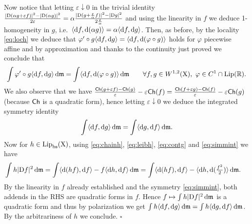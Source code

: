\documentclass[11pt]{article}
\numberwithin{equation}{section}
\newenvironment{idea}{\removelastskip\par\medskip   %
\noindent{\em Idea of the proof} \rm}{\penalty-20\null\hfill$\square$\par\medbreak}
\newcommand{\R}{\mathbb{R}}
\newcommand{\X}{{\rm X}}
\newcommand{\mm}{{\mathfrak m}}
\newcommand{\ch}{{\sf Ch}}
\renewcommand{\d}{{\rm d}}
\newcommand{\D}{{\rm D}}
\newcommand{\Lip}{{\rm Lip}}
\newcommand{\bs}{{\rm bs}}
\newcommand{\eps}{\varepsilon}
\newcommand\la{\langle}
\newcommand\ra{\rangle}
\begin{document}
\begin{idea}
Now notice that letting $\eps\downarrow0$ in the trivial identity $\frac{|\D(\alpha g+\eps f)|^2-|\D(\alpha g)|^2}{2\eps}=\alpha \frac{|\D(g+\frac\eps\alpha f)|^2-|\D g|^2}{2\frac\eps\alpha}$ and using the linearity in $f$ we deduce 1-homogeneity in $g$, i.e.\  $\la\d f,\d(\alpha g)\ra=\alpha\la\d f,\d g\ra$. Then, as before, by the locality \eqref{eq:loch} we deduce that $\varphi'\circ g\la \d f,\d g\ra=\la\d f,\d(\varphi\circ g)\ra$ holds for $\varphi$ piecewise affine and by approximation and thanks to the continuity just proved we conclude that
\begin{equation}
\label{eq:contg}
\int\varphi'\circ g\la \d f,\d g\ra\,\d \mm=\int\la\d f,\d(\varphi\circ g)\ra\,\d\mm\qquad\forall f,g\in W^{1,2}(\X),\ \varphi\in C^1\cap\Lip(\R).
\end{equation}
We also observe that we have $\frac{\ch(g+\eps f)-\ch(g)}{\eps}-\eps\ch(f)=\frac{\ch(f+\eps g)-\ch(f)}{\eps}-\eps\ch(g)$ (because $\ch$ is a quadratic form), hence letting $\eps\downarrow0$ we deduce the integrated symmetry identity
\begin{equation}
\label{eq:simmint}
\int\la\d f,\d g\ra\,\d\mm=\int\la\d g,\d f\ra\,\d\mm.
\end{equation}
Now for $h\in \Lip_{\bs}(\X)$, using \eqref{eq:chainh}, \eqref{eq:leibh}, \eqref{eq:contg} and \eqref{eq:simmint} we have
\[
\begin{split}
\int h|\D f|^2\,\d\mm&=\int \la\d(hf),\d f\ra -f\la \d h,\d f\ra\,\d\mm=\int \la\d(hf),\d f\ra -\la \d h,\d (\tfrac{f^2}2)\ra\,\d\mm.%
\end{split}
\]
By the linearity in $f$ already established and the symmetry \eqref{eq:simmint}, both addends in the RHS are quadratic forms in $f$. Hence $f\mapsto \int h|\D f|^2\,\d\mm$ is a quadratic form and thus by polarization we get $\int h\la\d f,\d g\ra\,\d\mm=\int h\la\d g,\d f\ra\,\d\mm$. By the arbitrariness of $h$ we conclude.
\end{idea}
\end{document}
